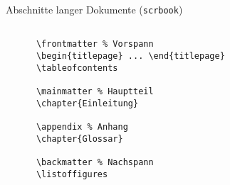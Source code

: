 \begin{frame}[fragile]{Abschnitte langer Dokumente (\lstinline-scrbook-)}
  \begin{lstlisting}[gobble=4]
    
      \frontmatter % Vorspann
      \begin{titlepage} ... \end{titlepage}
      \tableofcontents

      \mainmatter % Hauptteil
      \chapter{Einleitung}

      \appendix % Anhang
      \chapter{Glossar}
      
      \backmatter % Nachspann
      \listoffigures
    
  \end{lstlisting}
\end{frame}

